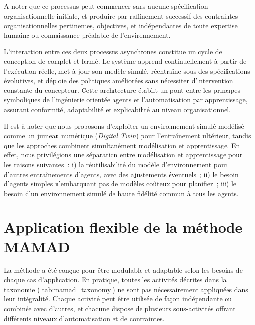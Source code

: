 A noter que ce processus peut commencer sans aucune spécification organisationnelle initiale, et produire par raffinement successif des contraintes organisationnelles pertinentes, objectives, et indépendantes de toute expertise humaine ou connaissance préalable de l'environnement.

\noindent L'interaction entre ces deux processus asynchrones constitue un cycle de conception de  complet et fermé. Le système apprend continuellement à partir de l'exécution réelle, met à jour son modèle simulé, réentraîne sous des spécifications évolutives, et déploie des politiques améliorées sans nécessiter d'intervention constante du concepteur. Cette architecture établit un pont entre les principes symboliques de l'ingénierie orientée agents et l'automatisation par apprentissage, assurant conformité, adaptabilité et explicabilité au niveau organisationnel.

\noindent Il est à noter que nous proposons d'exploiter un environnement simulé modélisé comme un jumeau numérique (\textit{Digital Twin}) pour l'entraînement ultérieur, tandis que les approches  combinent simultanément modélisation et apprentissage. En effet, nous privilégions une séparation entre modélisation et apprentissage pour les raisons suivantes~: i) la réutilisabilité du modèle d'environnement pour d'autres entraînements d'agents, avec des ajustements éventuels~; \quad ii) le besoin d'agents simples n'embarquant pas de modèles coûteux pour planifier~; \quad iii) le besoin d'un environnement simulé de haute fidélité commun à tous les agents.

\section{Application flexible de la méthode MAMAD}
\label{subsec:mamad_flexible}



La méthode  a été conçue pour être modulable et adaptable selon les besoins de chaque cas d'application.
En pratique, toutes les activités décrites dans la taxonomie (\autoref{tab:mamad_taxonomy}) ne sont pas nécessairement appliquées dans leur intégralité.
Chaque activité peut être utilisée de façon indépendante ou combinée avec d'autres, et chacune dispose de plusieurs sous-activités offrant différents niveaux d'automatisation et de contraintes.

